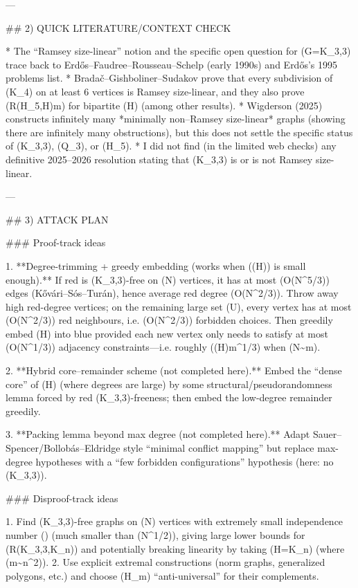 ---

## 2) QUICK LITERATURE/CONTEXT CHECK

* The “Ramsey size-linear” notion and the specific open question for (G=K_{3,3}) trace back to Erdős–Faudree–Rousseau–Schelp (early 1990s) and Erdős’s 1995 problems list.
* Bradač–Gishboliner–Sudakov prove that every subdivision of (K_4) on at least 6 vertices is Ramsey size-linear, and they also prove (R(H_5,H)\ll m) for bipartite (H) (among other results).
* Wigderson (2025) constructs infinitely many *minimally non–Ramsey size-linear* graphs (showing there are infinitely many obstructions), but this does not settle the specific status of (K_{3,3}), (Q_3), or (H_5).
* I did not find (in the limited web checks) any definitive 2025–2026 resolution stating that (K_{3,3}) is or is not Ramsey size-linear.

---

## 3) ATTACK PLAN

### Proof-track ideas

1. **Degree-trimming + greedy embedding (works when (\Delta(H)) is small enough).**
   If red is (K_{3,3})-free on (N) vertices, it has at most (O(N^{5/3})) edges (Kővári–Sós–Turán), hence average red degree (O(N^{2/3})). Throw away high red-degree vertices; on the remaining large set (U), every vertex has at most (O(N^{2/3})) red neighbours, i.e. (O(N^{2/3})) forbidden choices.
   Then greedily embed (H) into blue provided each new vertex only needs to satisfy at most (O(N^{1/3})) adjacency constraints—i.e. roughly (\Delta(H)\lesssim m^{1/3}) when (N\sim m).

2. **Hybrid core–remainder scheme (not completed here).**
   Embed the “dense core” of (H) (where degrees are large) by some structural/pseudorandomness lemma forced by red (K_{3,3})-freeness; then embed the low-degree remainder greedily.

3. **Packing lemma beyond max degree (not completed here).**
   Adapt Sauer–Spencer/Bollobás–Eldridge style “minimal conflict mapping” but replace max-degree hypotheses with a “few forbidden configurations” hypothesis (here: no (K_{3,3})).

### Disproof-track ideas

1. Find (K_{3,3})-free graphs on (N) vertices with extremely small independence number (\alpha) (much smaller than (N^{1/2})), giving large lower bounds for (R(K_{3,3},K_n)) and potentially breaking linearity by taking (H=K_n) (where (m\sim n^2)).
2. Use explicit extremal constructions (norm graphs, generalized polygons, etc.) and choose (H_m) “anti-universal” for their complements.

